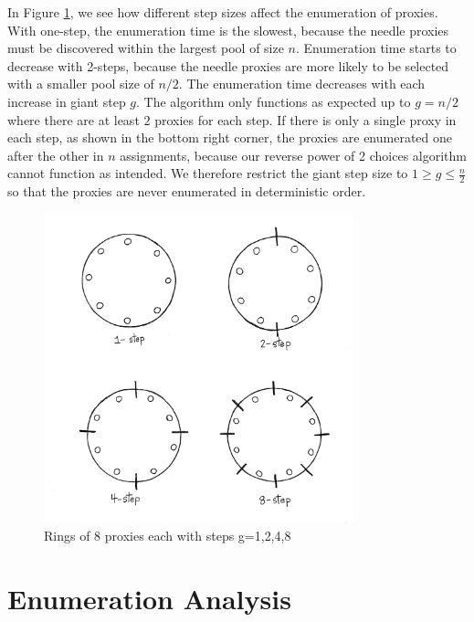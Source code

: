 In Figure \ref{fig:8ring}, we see how different step sizes affect the enumeration of proxies. With one-step, the enumeration time is the slowest, because the needle proxies must be discovered within the largest pool of size $n$. Enumeration time starts to decrease with 2-steps, because the needle proxies are more likely to be selected with a smaller pool size of $n/2$. The enumeration time decreases with each increase in giant step $g$. The algorithm only functions as expected up to $g=n/2$ where there are at least $2$ proxies for each step. If there is only a single proxy in each step, as shown in the bottom right corner, the proxies are enumerated one after the other in $n$ assignments, because our reverse power of 2 choices algorithm cannot function as intended. We therefore restrict the giant step size to $1\geq g\leq \frac{n}{2}$ so that the proxies are never enumerated in deterministic order.

\begin{figure}[h!]
\centering
     \includegraphics[width=0.8\textwidth]{fig/4ringexamples.png}
    \caption{Rings of 8 proxies each with steps g=1,2,4,8}

    \label{fig:8ring}
\end{figure}
 
\section{Enumeration Analysis}
\label{sec:enum}

